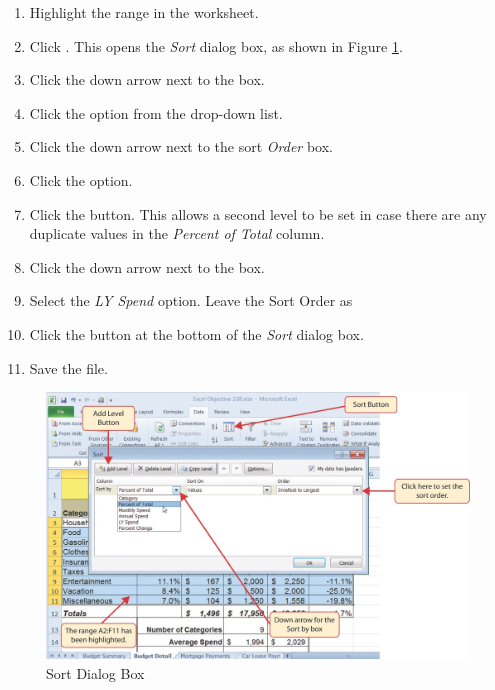 \begin{enumerate}
	\item Highlight the range  in the  worksheet.
	\item Click . This opens the \textit{Sort} dialog box, as shown in Figure \ref{02:fig27}.
	\item Click the down arrow next to the  box.
	\item Click the  option from the drop-down list.
	\item Click the down arrow next to the sort \textit{Order} box.
	\item Click the  option.
	\item Click the  button. This allows a second level to be set in case there are any duplicate values in the \textit{Percent of Total} column.
	\item Click the down arrow next to the  box.
	\item Select the \textit{LY Spend} option. Leave the Sort Order as 
	\item Click the  button at the bottom of the \textit{Sort} dialog box.
	\item Save the  file.
\end{enumerate}

\begin{figure}[H]
	\centering
	\includegraphics[width=\maxwidth{.95\linewidth}]{gfx/ch02_fig27}
	\caption{Sort Dialog Box}
	\label{02:fig27}
\end{figure}

